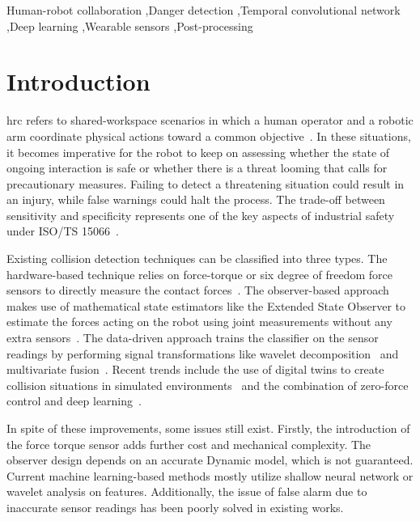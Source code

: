 \documentclass[a4paper,fleqn]{cas-sc}
\begin{document}
\begin{keywords}
    Human-robot collaboration \sep Danger detection \sep Temporal convolutional network \sep Deep learning \sep Wearable sensors \sep Post-processing
\end{keywords}

\maketitle

\section{Introduction}\label{sec:introduction}

\Ac{hrc} refers to shared-workspace scenarios in which a human operator and a robotic arm coordinate physical actions toward a common objective~\cite{selvaggio2021autonomy}. In these situations, it becomes imperative for the robot to keep on assessing whether the state of ongoing interaction is safe or whether there is a threat looming that calls for precautionary measures. Failing to detect a threatening situation could result in an injury, while false warnings could halt the process. The trade-off between sensitivity and specificity represents one of the key aspects of industrial safety under ISO/TS 15066~\cite{iso15066}.

Existing collision detection techniques can be classified into three types. The hardware-based technique relies on force-torque or six degree of freedom force sensors to directly measure the contact forces~\cite{wang2025sixdof}. The observer-based approach makes use of mathematical state estimators like the Extended State Observer to estimate the forces acting on the robot using joint measurements without any extra sensors~\cite{tonti2024eso}. The data-driven approach trains the classifier on the sensor readings by performing signal transformations like wavelet decomposition~\cite{niu2024wavelet} and multivariate fusion~\cite{fang2024multivariate}. Recent trends include the use of digital twins to create collision situations in simulated environments~\cite{an2024digitaltwin} and the combination of zero-force control and deep learning~\cite{zhao2025zeroforce}.

In spite of these improvements, some issues still exist. Firstly, the introduction of the force torque sensor adds further cost and mechanical complexity. The observer design depends on an accurate Dynamic model, which is not guaranteed. Current machine learning-based methods mostly utilize shallow neural network or wavelet analysis on features. Additionally, the issue of false alarm due to inaccurate sensor readings has been poorly solved in existing works.
\end{document}

